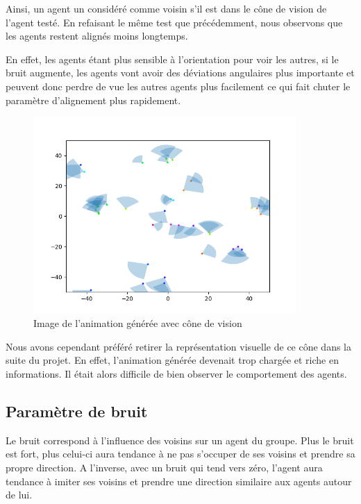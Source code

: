 \documentclass[french, a4paper, 12pt, openany]{report}
\begin{document}
		Ainsi, un agent un considéré comme voisin s'il est dans le cône de vision de l'agent testé. En refaisant le même test que précédemment, nous observons que les agents restent alignés moins longtemps.
		
		En effet, les agents étant plus sensible à l'orientation pour voir les autres, si le bruit augmente, les agents vont avoir des déviations angulaires plus importante et peuvent donc perdre de vue les autres agents plus facilement ce qui fait chuter le paramètre d'alignement plus rapidement.
	
	
   \begin{figure}[!h]
		\centering
		\includegraphics[width=10cm]{images/image_12.png}
		\caption{Image de l'animation générée avec cône de vision}
		\label{cone_vision}
	\end{figure}  
	
	Nous avons cependant préféré retirer la représentation visuelle de ce cône dans la suite du projet. En effet, l'animation générée devenait trop chargée et riche en informations. Il était alors difficile de bien observer le comportement des agents.\\  
  
  \subsection{Paramètre de bruit}
    
   Le bruit correspond à l'influence des voisins sur un agent du groupe. Plus le bruit est fort, plus celui-ci aura tendance à ne pas s'occuper de ses voisins et prendre sa propre direction. A l'inverse, avec un bruit qui tend vers zéro, l'agent aura tendance à imiter ses voisins et prendre une direction similaire aux agents autour de lui. \\
    
\end{document}
